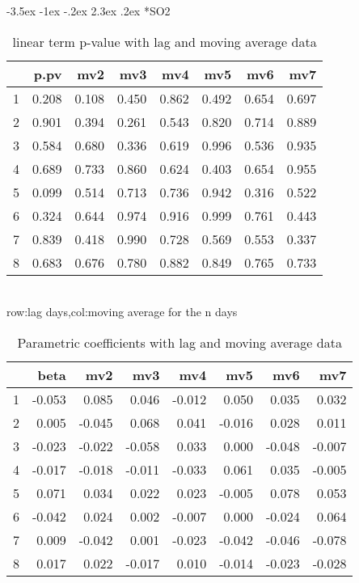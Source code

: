 \documentclass[a4paper, 12pt]{article}
\makeatletter
\def\large{\fontsize{14}{20}\selectfont}
\renewcommand\subsection{\@startsection {subsection}{1}{\z@}%
                                   {-3.5ex \@plus -1ex \@minus -.2ex}%
                                   {2.3ex \@plus.2ex}%
                                   {\centering\normalfont\large\bfseries}}
\makeatother
\begin{document}
\subsection*{SO2}
\begin{table}[h]
\centering
\caption{linear term p-value with lag and moving average data}
\begin{tabular}{rrrrrrrr}
  \hline
 & p.pv & mv2 & mv3 & mv4 & mv5 & mv6 & mv7 \\
  \hline
1 & 0.208 & 0.108 & 0.450 & 0.862 & 0.492 & 0.654 & 0.697 \\
  2 & 0.901 & 0.394 & 0.261 & 0.543 & 0.820 & 0.714 & 0.889 \\
  3 & 0.584 & 0.680 & 0.336 & 0.619 & 0.996 & 0.536 & 0.935 \\
  4 & 0.689 & 0.733 & 0.860 & 0.624 & 0.403 & 0.654 & 0.955 \\
  5 & 0.099 & 0.514 & 0.713 & 0.736 & 0.942 & 0.316 & 0.522 \\
  6 & 0.324 & 0.644 & 0.974 & 0.916 & 0.999 & 0.761 & 0.443 \\
  7 & 0.839 & 0.418 & 0.990 & 0.728 & 0.569 & 0.553 & 0.337 \\
  8 & 0.683 & 0.676 & 0.780 & 0.882 & 0.849 & 0.765 & 0.733 \\
   \hline
\end{tabular}
\\row:lag days,col:moving average for the n days
\end{table}

\begin{table}[h]
\centering
\caption{Parametric coefficients with lag and moving average data}
\begin{tabular}{rrrrrrrr}
  \hline
 & beta & mv2 & mv3 & mv4 & mv5 & mv6 & mv7 \\
  \hline
1 & -0.053 & 0.085 & 0.046 & -0.012 & 0.050 & 0.035 & 0.032 \\
  2 & 0.005 & -0.045 & 0.068 & 0.041 & -0.016 & 0.028 & 0.011 \\
  3 & -0.023 & -0.022 & -0.058 & 0.033 & 0.000 & -0.048 & -0.007 \\
  4 & -0.017 & -0.018 & -0.011 & -0.033 & 0.061 & 0.035 & -0.005 \\
  5 & 0.071 & 0.034 & 0.022 & 0.023 & -0.005 & 0.078 & 0.053 \\
  6 & -0.042 & 0.024 & 0.002 & -0.007 & 0.000 & -0.024 & 0.064 \\
  7 & 0.009 & -0.042 & 0.001 & -0.023 & -0.042 & -0.046 & -0.078 \\
  8 & 0.017 & 0.022 & -0.017 & 0.010 & -0.014 & -0.023 & -0.028 \\
   \hline
\end{tabular}
\end{table}
\clearpage
\end{document}
